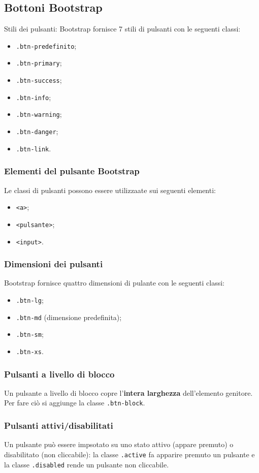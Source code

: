 \documentclass{article}
\begin{document}
\subsection{Bottoni Bootstrap}
Stili dei pulsanti: Bootstrap fornisce 7 stili di pulsanti con le seguenti classi:
\begin{itemize}
    \item \texttt{.btn-predefinito};
    \item \texttt{.btn-primary};
    \item \texttt{.btn-success};
    \item \texttt{.btn-info};
    \item \texttt{.btn-warning};
    \item \texttt{.btn-danger};
    \item \texttt{.btn-link}.
\end{itemize}
\subsubsection{Elementi del pulsante Bootstrap}
Le classi di pulsanti possono essere utilizzaate sui seguenti elementi:
\begin{itemize}
    \item \texttt{<a>};
    \item \texttt{<pulsante>};
    \item \texttt{<input>}.
\end{itemize}
\subsubsection{Dimensioni dei pulsanti}
Bootstrap fornisce quattro dimensioni di pulante con le seguenti classi:
\begin{itemize}
    \item \texttt{.btn-lg};
    \item \texttt{.btn-md} (dimensione predefinita);
    \item \texttt{.btn-sm};
    \item \texttt{.btn-xs}.
\end{itemize}
\subsubsection{Pulsanti a livello di blocco}
Un pulsante a livello di blocco copre l'\textbf{intera larghezza} dell'elemento genitore. Per fare ciò si aggiunge la classe \texttt{.btn-block}. 
\subsubsection{Pulsanti attivi/disabilitati}
Un pulsante può essere impsotato su uno stato attivo (appare premuto) o disabilitato (non cliccabile): la classe \texttt{.active} fa apparire premuto un pulsante e la classe \texttt{.disabled} rende un pulsante non cliccabile.
\end{document}
